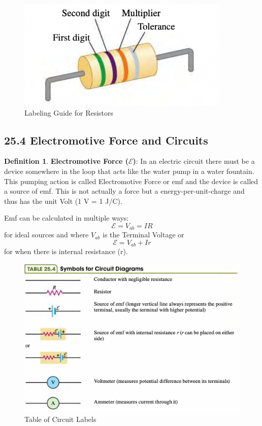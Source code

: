 \documentclass[12pt]{amsart}
\theoremstyle{definition}
\newtheorem{definition}{Definition} %
\numberwithin{equation}{theorem}    %
\begin{document}
\begin{figure}[H]
    \centering
    \includegraphics[width=4in]{Media/Resistor.png}
    \caption{Labeling Guide for Resistors}
    \label{Labeling Guide for Resistors}
\end{figure}

\subsection*{25.4 Electromotive Force and Circuits}

\begin{definition}
    \textbf{Electromotive Force ($\mathcal{E}$)}:
    In an electric circuit there must be a device somewhere in the loop that 
    acts like the water pump in a water fountain. This pumping action is called 
    Electromotive Force or emf and the device is called a source of emf. This is not actually
    a force but a energy-per-unit-charge and thus has the unit Volt (1 V = 1 J/C).

    Emf can be calculated in multiple ways:
    $$\mathcal{E} = V_{ab} = IR $$ for ideal sources and where $V_{ab}$ is the Terminal Voltage
    or $$\mathcal{E} = V_{ab} + Ir$$ for when there is internal resistance (r).
\end{definition}

\begin{figure}[H]
    \centering
    \includegraphics[width=5in]{Media/Circuit.png}
    \caption{Table of Circuit Labels}
    \label{Table of Circuit Labels}
\end{figure}
\end{document}
